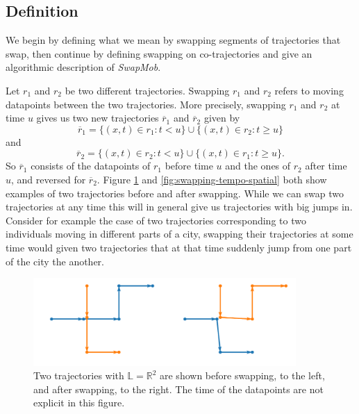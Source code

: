 \documentclass[12pt]{article}
\newcommand{\R}{\mathbb{R}}
\newcommand{\loc}{x}
\newcommand{\tim}{t}
\newcommand{\traj}{r}
\newcommand{\swaptime}{u}
\newcommand{\locset}{\mathbb{L}}
\theoremstyle{definition}
\begin{document}
\subsection{Definition}
We begin by defining what we mean by swapping segments of trajectories
that swap, then continue by defining swapping on co-trajectories and
give an algorithmic description of \emph{SwapMob}.

Let \(\traj_{1}\) and \(\traj_{2}\) be two different trajectories.
Swapping \(\traj_{1}\) and \(\traj_{2}\) refers to moving datapoints
between the two trajectories. More precisely, swapping \(\traj_{1}\)
and \(\traj_{2}\) at time \(\swaptime\) gives us two new trajectories
\(\overline{\traj}_{1}\) and \(\overline{\traj}_{2}\) given by
\begin{equation*}
  \overline{\traj}_{1} = \{(\loc, \tim) \in \traj_{1}: \tim < \swaptime\}
  \cup \{(\loc, \tim) \in \traj_{2}: \tim \geq \swaptime\}
\end{equation*}
and
\begin{equation*}
  \overline{\traj}_{2} = \{(\loc, \tim) \in \traj_{2}: \tim < \swaptime\}
  \cup \{(\loc, \tim) \in \traj_{1}: \tim \geq \swaptime\}.
\end{equation*}
So \(\overline{\traj}_{1}\) consists of the datapoints of
\(\traj_{1}\) before time \(\swaptime\) and the ones of \(\traj_{2}\)
after time \(\swaptime\), and reversed for \(\overline{\traj}_{2}\).
Figure \ref{fig:swapping-spatial} and \ref{fig:swapping-tempo-spatial}
both show examples of two trajectories before and after swapping.
While we can swap two trajectories at any time this will in general
give us trajectories with big jumps in. Consider for example the case
of two trajectories corresponding to two individuals moving in
different parts of a city, swapping their trajectories at some time
would given two trajectories that at that time suddenly jump from one
part of the city the another.

\begin{figure}
  \centering
  \includegraphics[width=10cm]{swapping-spatial.pdf}
  \caption{Two trajectories with \(\locset = \R^{2}\) are shown before
    swapping, to the left, and after swapping, to the right. The time
    of the datapoints are not explicit in this figure.}
  \label{fig:swapping-spatial}
\end{figure}
\end{document}
